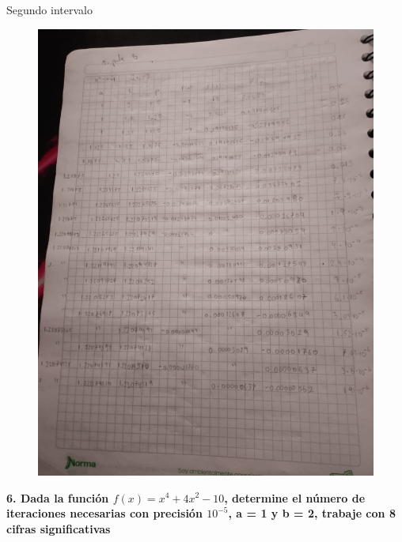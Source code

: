 \documentclass[12pt]{article}
\begin{document}
Segundo intervalo
\begin{figure}[H]
\centering
\includegraphics[width=1\textwidth]{./inFiles/Figures/6.jpeg}
\end{figure}



\textbf{6. Dada la función $f(x) = x^4 + 4x^2 - 10$, determine el número de iteraciones necesarias con precisión $10^{-5}$, a = 1 y b = 2, trabaje con 8 cifras significativas} 
\end{document}
